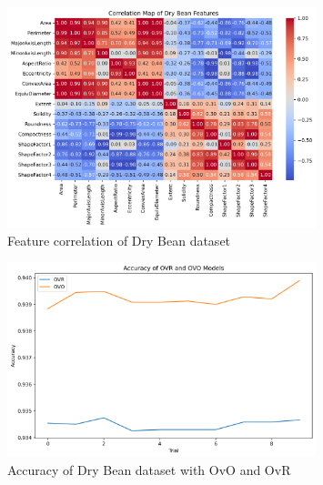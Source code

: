 \documentclass[12pt,a4paper]{article}
\begin{document}
\begin{figure}[h]
    \centering
    \includegraphics[width=0.8\textwidth]{figures/dry_bean_correlation.png}
    \caption{Feature correlation of Dry Bean dataset}
    \label{fig:feature_correlation}
\end{figure}

\begin{figure}[h]
    \centering
    \includegraphics[width=0.8\textwidth]{figures/dry_bean_ovo_ovr_accuracy.png}
    \caption{Accuracy of Dry Bean dataset with OvO and OvR}
    \label{fig:dry_bean_accuracy}
\end{figure}
\end{document}
